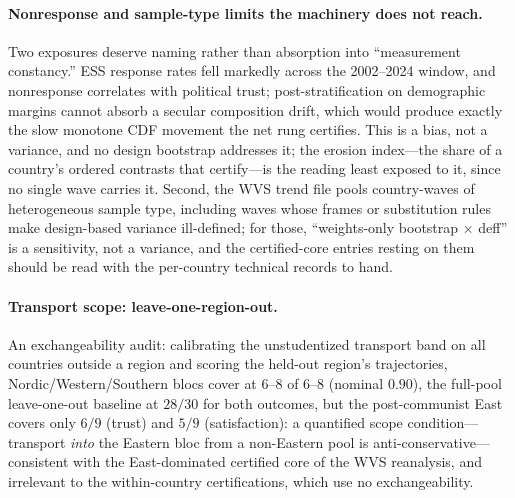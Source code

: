 \documentclass[12pt]{article}
\theoremstyle{definition}
\theoremstyle{remark}
\begin{document}
\paragraph{Nonresponse and sample-type limits the machinery does not reach.}
Two exposures deserve naming rather than absorption into ``measurement
constancy.'' ESS response rates fell markedly across the 2002--2024 window, and
nonresponse correlates with political trust; post-stratification on demographic
margins cannot absorb a secular composition drift, which would produce exactly
the slow monotone CDF movement the net rung certifies. This is a bias, not a
variance, and no design bootstrap addresses it; the erosion index---the share of a country's ordered
contrasts that certify---is the reading least exposed to it, since no single
wave carries it.
Second, the WVS trend file pools country-waves of heterogeneous sample type,
including waves whose frames or substitution rules make design-based variance
ill-defined; for those, ``weights-only bootstrap $\times$ deff'' is a
sensitivity, not a variance, and the certified-core entries resting on them
should be read with the per-country technical records to hand.

\paragraph{Transport scope: leave-one-region-out.} An exchangeability audit: calibrating the unstudentized transport band on all
countries outside a region and scoring the held-out region's trajectories,
Nordic/Western/Southern blocs cover at $6$--$8$ of $6$--$8$ (nominal $0.90$),
the full-pool leave-one-out baseline at $28/30$ for both outcomes, but the
post-communist East covers only $6/9$ (trust) and $5/9$ (satisfaction): a
quantified scope condition---transport \emph{into} the Eastern bloc from a
non-Eastern pool is anti-conservative---consistent with the East-dominated
certified core of the WVS reanalysis, and irrelevant to the within-country
certifications, which use no exchangeability.
\end{document}
